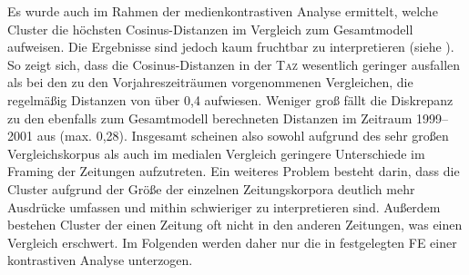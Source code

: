 Es wurde auch im Rahmen der medienkontrastiven Analyse ermittelt, welche Cluster die höchsten Cosinus-Distanzen im Vergleich zum Gesamtmodell aufweisen. Die Ergebnisse sind jedoch kaum fruchtbar zu interpretieren (siehe ). So zeigt sich, dass die Cosinus-Distanzen in der \textsc{Taz} wesentlich geringer ausfallen als bei den zu den Vorjahreszeiträumen vorgenommenen Vergleichen, die regelmäßig Distanzen von über 0,4 aufwiesen. Weniger groß fällt die Diskrepanz zu den ebenfalls zum Gesamtmodell berechneten Distanzen im Zeitraum 1999--2001 aus (max. 0,28). Insgesamt scheinen also sowohl aufgrund des sehr großen Vergleichskorpus als auch im medialen Vergleich geringere Unterschiede im Framing der Zeitungen aufzutreten. Ein weiteres Problem besteht darin, dass die Cluster aufgrund der Größe der einzelnen Zeitungskorpora deutlich mehr Ausdrücke umfassen und mithin schwieriger zu interpretieren sind. Außerdem bestehen Cluster der einen Zeitung oft nicht in den anderen Zeitungen, was einen Vergleich erschwert. Im Folgenden werden daher nur die in  festgelegten FE einer kontrastiven Analyse unterzogen.

